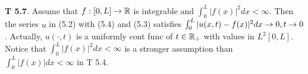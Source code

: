 {\bf T 5.7}. Assume that $f: [0,L] \rightarrow \mathbb{R}$ is integrable and $\int_0^L|f(x)|^2dx<\infty$. Then the series $u$ in (5.2) with (5.4) and (5.3) satisfies $\int _0^L |u(x,t) - f(x)|^2dx \rightarrow 0, t \rightarrow 0$. Actually, $u(\cdot, t)$ is a uniformly cont func of $t \in \mathbb{R}_+$ with values in $L^2[0,L]$. Notice that $\int_0^L|f(x)|^2dx<\infty$ is a stronger assumption than $\int_0^L|f(x)|dx<\infty$ in T 5.4. 
